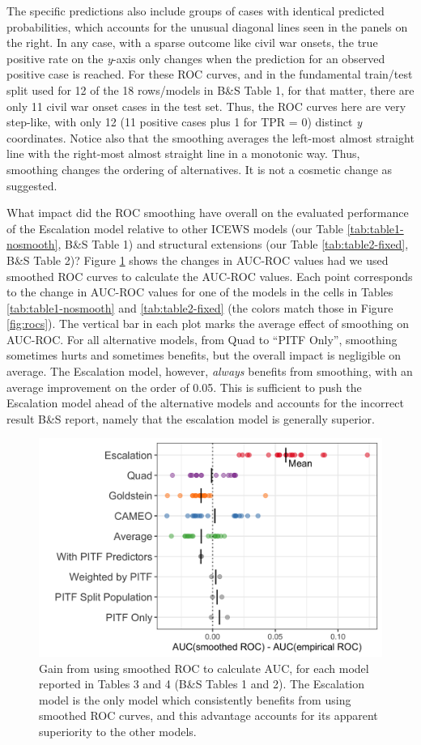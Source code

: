 \documentclass[
]{article}
\begin{document}
The specific predictions also include groups of cases with identical predicted probabilities, which accounts for the unusual diagonal lines seen in the panels on the right. In any case, with a sparse outcome like civil war onsets, the true positive rate on the \emph{y}-axis only changes when the prediction for an observed positive case is reached. For these ROC curves, and in the fundamental train/test split used for 12 of the 18 rows/models in B\&S Table 1, for that matter, there are only 11 civil war onset cases in the test set. Thus, the ROC curves here are very step-like, with only 12 (11 positive cases plus 1 for TPR = 0) distinct \emph{y} coordinates. Notice also that the smoothing averages the left-most almost straight line with the right-most almost straight line in a monotonic way. Thus, smoothing changes the ordering of alternatives. It is not a cosmetic change as suggested.

What impact did the ROC smoothing have overall on the evaluated performance of the Escalation model relative to other ICEWS models (our Table \ref{tab:table1-nosmooth}, B\&S Table 1) and structural extensions (our Table \ref{tab:table2-fixed}, B\&S Table 2)? Figure \ref{fig:benefit-plot} shows the changes in AUC-ROC values had we used smoothed ROC curves to calculate the AUC-ROC values. Each point corresponds to the change in AUC-ROC values for one of the models in the cells in Tables \ref{tab:table1-nosmooth} and \ref{tab:table2-fixed} (the colors match those in Figure \ref{fig:rocs}). The vertical bar in each plot marks the average effect of smoothing on AUC-ROC. For all alternative models, from Quad to ``PITF Only'', smoothing sometimes hurts and sometimes benefits, but the overall impact is negligible on average. The Escalation model, however, \emph{always} benefits from smoothing, with an average improvement on the order of 0.05. This is sufficient to push the Escalation model ahead of the alternative models and accounts for the incorrect result B\&S report, namely that the escalation model is generally superior.

\begin{figure}
\caption{Gain from using smoothed ROC to calculate AUC, for each model reported in Tables 3 and 4 (B\&S Tables 1 and 2). The Escalation model is the only model which consistently benefits from using smoothed ROC curves, and this advantage accounts for its apparent superiority to the other models.\label{fig:benefit-plot}}
\centering
\includegraphics[width=.8\linewidth]{figures/fig-2-benefit-plot.png}
\end{figure}
\end{document}
